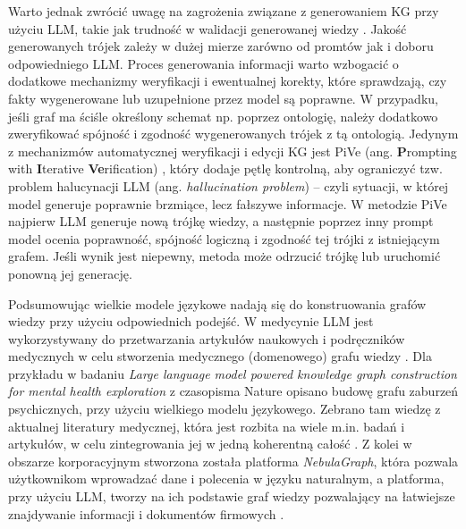 \documentclass[
a4paper,
12pt,
]{article}
\begin{document}
Warto jednak zwrócić uwagę na zagrożenia związane z generowaniem KG przy użyciu LLM, takie jak trudność w walidacji generowanej wiedzy \cite{kgllm:construction:hard}. Jakość generowanych trójek zależy w dużej mierze zarówno od promtów jak i doboru odpowiedniego LLM. Proces generowania informacji warto wzbogacić o dodatkowe mechanizmy weryfikacji i ewentualnej korekty, które sprawdzają, czy fakty wygenerowane lub uzupełnione przez model są poprawne. W przypadku, jeśli graf ma ściśle określony schemat np. poprzez ontologię, należy dodatkowo zweryfikować spójność i zgodność wygenerowanych trójek z tą ontologią. Jedynym z mechanizmów automatycznej weryfikacji i edycji KG jest PiVe (ang. \textbf{P}rompting with \textbf{I}terative \textbf{Ve}rification) \cite{kg:pive}, który dodaje pętlę kontrolną, aby ograniczyć tzw. problem halucynacji LLM (ang. \textit{hallucination problem}) -- czyli sytuacji, w której model generuje poprawnie brzmiące, lecz fałszywe informacje. W metodzie PiVe najpierw LLM generuje nową trójkę wiedzy, a następnie poprzez inny prompt model ocenia poprawność, spójność logiczną i zgodność tej trójki z istniejącym grafem. Jeśli wynik jest niepewny, metoda może odrzucić trójkę lub uruchomić ponowną jej generację.

Podsumowując wielkie modele językowe nadają się do konstruowania grafów wiedzy przy użyciu odpowiednich podejść. 
W medycynie LLM jest wykorzystywany do przetwarzania artykułów naukowych i podręczników medycznych w celu stworzenia medycznego (domenowego) grafu wiedzy \cite{kgllm:construction:med}. Dla przykładu w badaniu \textit{Large language model powered knowledge graph construction for mental health exploration} z czasopisma Nature opisano budowę grafu zaburzeń psychicznych, przy użyciu wielkiego modelu językowego. Zebrano tam wiedzę z aktualnej literatury medycznej, która jest rozbita na wiele m.in. badań i artykułów, w celu zintegrowania jej w jedną koherentną całość \cite{kgllm:construction:nature}.
Z kolei w obszarze korporacyjnym stworzona została platforma \textit{NebulaGraph}, która pozwala użytkownikom wprowadzać dane i polecenia w języku naturalnym, a platforma, przy użyciu LLM, tworzy na ich podstawie graf wiedzy pozwalający na łatwiejsze znajdywanie informacji i dokumentów firmowych \cite{kgllm:construction:nebula}.
\end{document}
